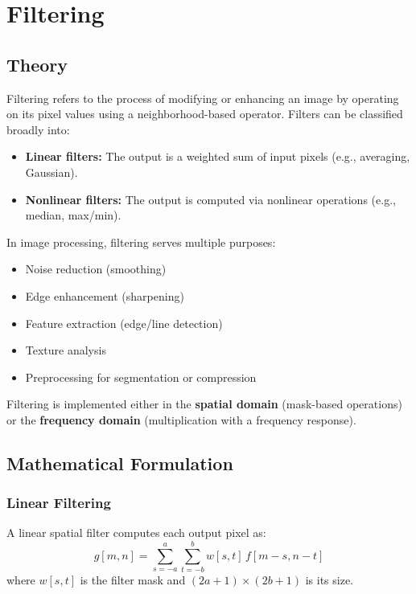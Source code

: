 \documentclass{AnantDocumentation}
\begin{document}
\section{Filtering}

\subsection{Theory}

Filtering refers to the process of modifying or enhancing an image by operating on its pixel values using a neighborhood-based operator.  
Filters can be classified broadly into:

\begin{itemize}
\item \textbf{Linear filters:} The output is a weighted sum of input pixels (e.g., averaging, Gaussian).
\item \textbf{Nonlinear filters:} The output is computed via nonlinear operations (e.g., median, max/min).
\end{itemize}

In image processing, filtering serves multiple purposes:
\begin{itemize}
\item Noise reduction (smoothing)
\item Edge enhancement (sharpening)
\item Feature extraction (edge/line detection)
\item Texture analysis
\item Preprocessing for segmentation or compression
\end{itemize}

Filtering is implemented either in the \textbf{spatial domain} (mask-based operations) or the \textbf{frequency domain} (multiplication with a frequency response).

\subsection{Mathematical Formulation}

\subsubsection{Linear Filtering}

A linear spatial filter computes each output pixel as:
\begin{equation}
g[m,n] = \sum_{s=-a}^{a} \sum_{t=-b}^{b} w[s,t] \, f[m-s, n-t]
\end{equation}
where $w[s,t]$ is the filter mask and $(2a+1)\times (2b+1)$ is its size.
\end{document}
